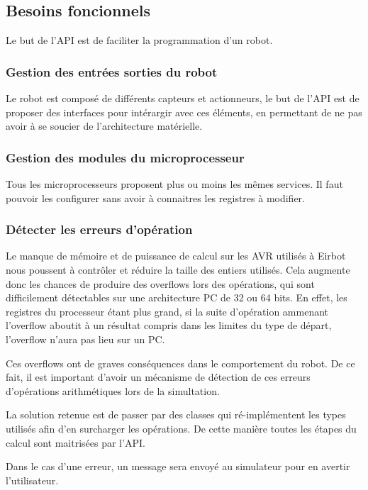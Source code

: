 \subsection{Besoins foncionnels}

Le but de l'API est de faciliter la programmation d'un robot.

\subsubsection{Gestion des entrées sorties du robot}

Le robot est composé de différents capteurs et actionneurs, le but de l'API est de proposer des interfaces pour intérargir avec ces éléments, en permettant de ne pas avoir à se soucier de l'architecture matérielle.

\subsubsection{Gestion des modules du microprocesseur}

Tous les microprocesseurs proposent plus ou moins les mêmes services. Il faut pouvoir les configurer sans avoir à connaitres les registres à modifier.

\subsubsection{Détecter les erreurs d'opération}

Le manque de mémoire et de puissance de calcul sur les AVR utilisés à Eirbot nous poussent à contrôler et réduire la taille des entiers utilisés. Cela augmente donc les chances de produire des overflows lors des opérations, qui sont difficilement détectables sur une architecture PC de 32 ou 64 bits. En effet, les registres du processeur étant plus grand, si la suite d'opération ammenant l'overflow aboutit à un résultat compris dans les limites du type de départ, l'overflow n'aura pas lieu sur un PC.

Ces overflows ont de graves conséquences dans le comportement du robot. De ce fait, il est important d'avoir un mécanisme de détection de ces erreurs d'opérations arithmétiques lors de la simultation.

La solution retenue est de passer par des classes qui ré-implémentent les types utilisés afin d'en surcharger les opérations. De cette manière toutes les étapes du calcul sont maitrisées par l'API.

Dans le cas d'une erreur, un message sera envoyé au simulateur pour en avertir l'utilisateur.

